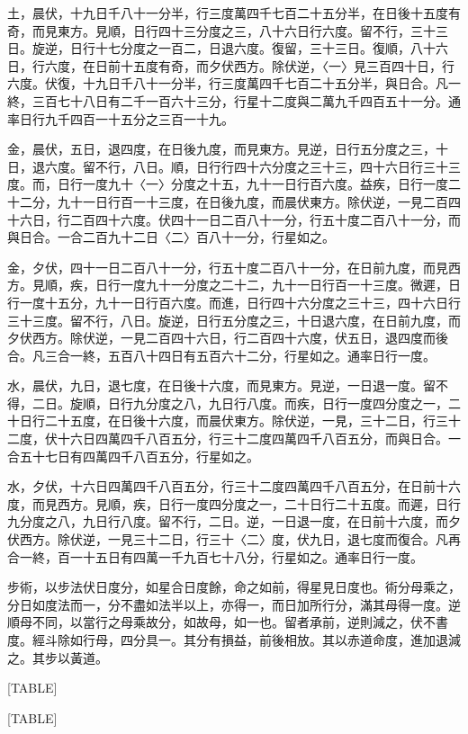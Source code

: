 \begin{pinyinscope}
土，晨伏，十九日千八十一分半，行三度萬四千七百二十五分半，在日後十五度有奇，而見東方。見順，日行四十三分度之三，八十六日行六度。留不行，三十三日。旋逆，日行十七分度之一百二，日退六度。復留，三十三日。復順，八十六日，行六度，在日前十五度有奇，而夕伏西方。除伏逆，〈一〉見三百四十日，行六度。伏復，十九日千八十一分半，行三度萬四千七百二十五分半，與日合。凡一終，三百七十八日有二千一百六十三分，行星十二度與二萬九千四百五十一分。通率日行九千四百一十五分之三百一十九。

金，晨伏，五日，退四度，在日後九度，而見東方。見逆，日行五分度之三，十日，退六度。留不行，八日。順，日行行四十六分度之三十三，四十六日行三十三度。而，日行一度九十〈一〉分度之十五，九十一日行百六度。益疾，日行一度二十二分，九十一日行百一十三度，在日後九度，而晨伏東方。除伏逆，一見二百四十六日，行二百四十六度。伏四十一日二百八十一分，行五十度二百八十一分，而與日合。一合二百九十二日〈二〉百八十一分，行星如之。

金，夕伏，四十一日二百八十一分，行五十度二百八十一分，在日前九度，而見西方。見順，疾，日行一度九十一分度之二十二，九十一日行百一十三度。微遲，日行一度十五分，九十一日行百六度。而進，日行四十六分度之三十三，四十六日行三十三度。留不行，八日。旋逆，日行五分度之三，十日退六度，在日前九度，而夕伏西方。除伏逆，一見二百四十六日，行二百四十六度，伏五日，退四度而後合。凡三合一終，五百八十四日有五百六十二分，行星如之。通率日行一度。

水，晨伏，九日，退七度，在日後十六度，而見東方。見逆，一日退一度。留不得，二日。旋順，日行九分度之八，九日行八度。而疾，日行一度四分度之一，二十日行二十五度，在日後十六度，而晨伏東方。除伏逆，一見，三十二日，行三十二度，伏十六日四萬四千八百五分，行三十二度四萬四千八百五分，而與日合。一合五十七日有四萬四千八百五分，行星如之。

水，夕伏，十六日四萬四千八百五分，行三十二度四萬四千八百五分，在日前十六度，而見西方。見順，疾，日行一度四分度之一，二十日行二十五度。而遲，日行九分度之八，九日行八度。留不行，二日。逆，一日退一度，在日前十六度，而夕伏西方。除伏逆，一見三十二日，行三十〈二〉度，伏九日，退七度而復合。凡再合一終，百一十五日有四萬一千九百七十八分，行星如之。通率日行一度。

步術，以步法伏日度分，如星合日度餘，命之如前，得星見日度也。術分母乘之，分日如度法而一，分不盡如法半以上，亦得一，而日加所行分，滿其母得一度。逆順母不同，以當行之母乘故分，如故母，如一也。留者承前，逆則減之，伏不書度。經斗除如行母，四分具一。其分有損益，前後相放。其以赤道命度，進加退減之。其步以黃道。

[TABLE]

[TABLE]


\end{pinyinscope}
